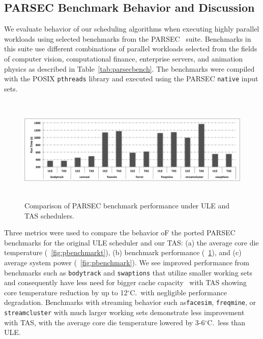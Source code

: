 \documentclass[times, 10pt,twocolumn]{IEEEtran}
\begin{document}
\subsection{PARSEC Benchmark Behavior and Discussion}
\label{sec:mult-behav} 
We evaluate behavior of our scheduling algorithms
when executing highly parallel workloads using selected benchmarks from
the PARSEC~\cite{Bienia2008} suite. Benchmarks in this suite use
different combinations of parallel workloads selected from the fields of
computer vision, computational finance, enterprise servers, and
animation physics as described in Table~\ref{tab:parsecbench}.  The
benchmarks were compiled with the POSIX \texttt{pthreads} library and
executed using the PARSEC \texttt{native} input sets.

\newline
\begin{figure}[!tbp]
  \includegraphics[width=1.0\linewidth,height=2in]{graphics/parsecperformance}
  \caption{Comparison of PARSEC benchmark performance under ULE and TAS
schedulers.}
  \label{fig:pbenchmarkp}
\end{figure} 
Three metrics were used to compare the behavior oF the ported PARSEC
benchmarks for the original ULE scheduler and our TAS: (a) the average
core die temperature (\figurename~\ref{fig:pbenchmarkt}), (b) benchmark
performance (\figurename~\ref{fig:pbenchmarkp}), and (c) average system
power (\figurename~\ref{fig:pbenchmark}).  We see improved performance
from benchmarks such as \texttt{bodytrack} and \texttt{swaptions} that utilize
smaller working sets and consequently have less need for bigger cache
capacity~\cite{Bienia2011} with TAS showing core temperature reduction by up to
12$^{\circ}$C.\ with negligible performance degradation.  Benchmarks
with streaming behavior such as\texttt{facesim}, \texttt{freqmine}, or
\texttt{streamcluster} with much larger working sets demonstrate less
improvement with TAS, with the average core die temperature lowered by 3-6$^{\circ}$C.\ less
than ULE.
\end{document}
